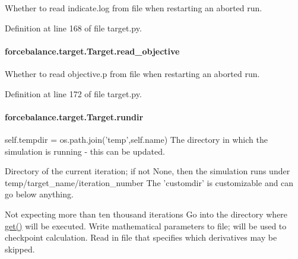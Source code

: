 Whether to read indicate.\-log from file when restarting an aborted run. 



Definition at line 168 of file target.\-py.

\hypertarget{classforcebalance_1_1target_1_1Target_a22bdc4bbce2020ae44b44ad3e444fda6}{
\paragraph[{read\-\_\-objective}]{\setlength{\rightskip}{0pt plus 5cm}forcebalance.\-target.\-Target.\-read\-\_\-objective\hspace{0.3cm}{\ttfamily [inherited]}}}\label{classforcebalance_1_1target_1_1Target_a22bdc4bbce2020ae44b44ad3e444fda6}


Whether to read objective.\-p from file when restarting an aborted run. 



Definition at line 172 of file target.\-py.

\hypertarget{classforcebalance_1_1target_1_1Target_a6872de5b2d4273b82336ea5b0da29c9e}{
\paragraph[{rundir}]{\setlength{\rightskip}{0pt plus 5cm}forcebalance.\-target.\-Target.\-rundir\hspace{0.3cm}{\ttfamily [inherited]}}}\label{classforcebalance_1_1target_1_1Target_a6872de5b2d4273b82336ea5b0da29c9e}


self.\-tempdir = os.\-path.\-join('temp',self.\-name) The directory in which the simulation is running -\/ this can be updated. 

Directory of the current iteration; if not None, then the simulation runs under temp/target\-\_\-name/iteration\-\_\-number The 'customdir' is customizable and can go below anything.

Not expecting more than ten thousand iterations Go into the directory where \hyperlink{classforcebalance_1_1target_1_1Target_a1389888302c49d529716cb45b13a6f5a}{get()} will be executed. Write mathematical parameters to file; will be used to checkpoint calculation. Read in file that specifies which derivatives may be skipped. 

